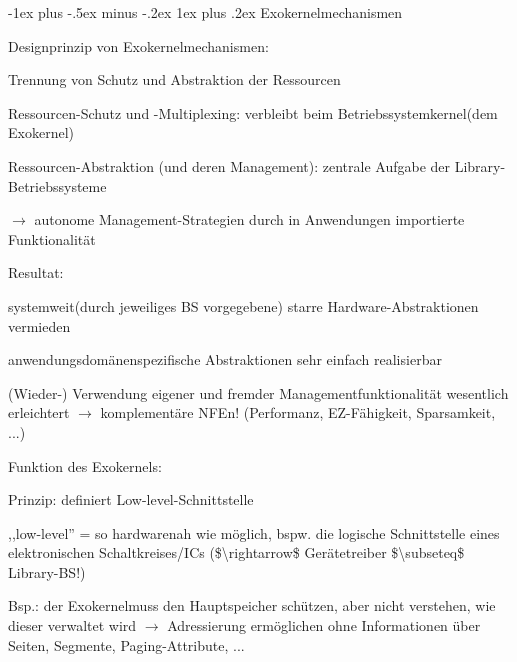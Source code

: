 \documentclass[a4paper]{article}
\makeatletter
\renewcommand{\subsubsection}{\@startsection{subsubsection}{3}{0mm}%
 {-1ex plus -.5ex minus -.2ex}%
 {1ex plus .2ex}%
 {\normalfont\small\bfseries}}
\makeatother
\begin{document}
\begin{multicols}{3}
    \subsubsection{Exokernelmechanismen}

    \begin{itemize*}
        \item
        Designprinzip von Exokernelmechanismen:
        \begin{itemize*}
            \item Trennung von Schutz und Abstraktion der Ressourcen
            \item Ressourcen-Schutz und -Multiplexing: verbleibt beim Betriebssystemkernel(dem Exokernel)
            \item Ressourcen-Abstraktion (und deren Management): zentrale Aufgabe der Library-Betriebssysteme \begin{itemize*} \item   $\rightarrow$  autonome Management-Strategien durch   in Anwendungen importierte Funktionalität \end{itemize*}
            \item Resultat: \begin{enumerate*}  \item   systemweit(durch jeweiliges BS vorgegebene) starre   Hardware-Abstraktionen vermieden \item   anwendungsdomänenspezifische Abstraktionen sehr einfach   realisierbar \item   (Wieder-) Verwendung eigener und fremder Managementfunktionalität   wesentlich erleichtert $\rightarrow$  komplementäre   NFEn! (Performanz, EZ-Fähigkeit, Sparsamkeit, ...) \end{enumerate*}
        \end{itemize*}
        \item
        Funktion des Exokernels:
        \begin{itemize*}
            \item Prinzip: definiert Low-level-Schnittstelle \begin{itemize*} \item   ,,low-level'' = so hardwarenah wie möglich, bspw. die logische   Schnittstelle eines elektronischen Schaltkreises/ICs   (\$\textbackslash rightarrow\$ Gerätetreiber   \$\textbackslash subseteq\$ Library-BS!) \item   Bsp.: der Exokernelmuss den Hauptspeicher schützen, aber nicht   verstehen, wie dieser verwaltet wird $\rightarrow$    Adressierung ermöglichen ohne Informationen über Seiten, Segmente,   Paging-Attribute, ... \end{itemize*}

\end{itemize*}
\end{itemize*}
\end{multicols}
\end{document}
